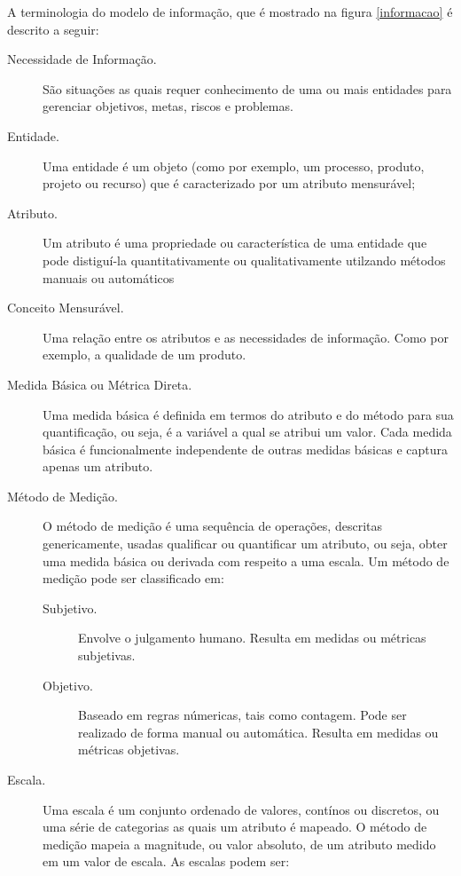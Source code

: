 		A terminologia do modelo de informação, que é mostrado na figura \ref{informacao} é descrito a seguir:
	\begin{description}
	 \item [Necessidade de Informação.]  São situações as quais requer conhecimento de uma ou mais entidades para gerenciar objetivos, metas, riscos e problemas.
	
	 \item [Entidade.]  Uma entidade é um objeto (como por exemplo, um processo, produto, projeto ou recurso) que é caracterizado por um atributo mensurável;
	 \item [Atributo.]  Um atributo é uma propriedade ou característica de uma entidade que pode distiguí-la quantitativamente ou qualitativamente utilzando métodos manuais ou automáticos
	
	 \item [Conceito Mensurável.]  Uma relação entre os atributos e as necessidades de informação. Como por exemplo, a qualidade de um produto. 
	 
	 \item [Medida Básica ou Métrica Direta.] Uma medida básica é definida em termos do atributo e do método para sua quantificação, ou seja, é a variável a qual se atribui um valor. Cada medida básica é funcionalmente independente de outras medidas básicas e captura apenas um atributo. 
	 \item [Método de Medição.] O método de medição é uma sequência de operações, descritas genericamente, usadas qualificar ou quantificar um atributo, ou seja, obter uma medida básica ou derivada com respeito a uma escala. Um método de medição pode ser classificado em:
	
		\begin{description}
		 \item [Subjetivo.] Envolve o julgamento humano. Resulta em medidas ou métricas subjetivas.
		 \item [Objetivo.] Baseado em regras númericas, tais como contagem. Pode ser realizado de forma manual ou automática. Resulta em medidas ou métricas objetivas.
		\end{description}
	 \item [Escala.] Uma escala é um conjunto ordenado de valores, contínos ou discretos, ou uma série de categorias as quais um atributo é mapeado. O método de medição mapeia a magnitude, ou valor absoluto, de um atributo medido em um valor de escala. As escalas podem ser: 
	

\end{description}
